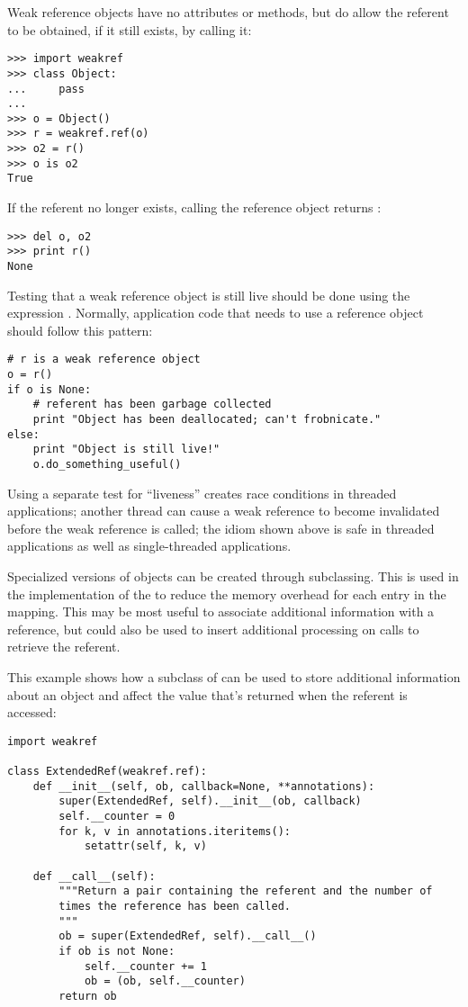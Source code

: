 Weak reference objects have no attributes or methods, but do allow the
referent to be obtained, if it still exists, by calling it:

\begin{verbatim}
>>> import weakref
>>> class Object:
...     pass
...
>>> o = Object()
>>> r = weakref.ref(o)
>>> o2 = r()
>>> o is o2
True
\end{verbatim}

If the referent no longer exists, calling the reference object returns
:

\begin{verbatim}
>>> del o, o2
>>> print r()
None
\end{verbatim}

Testing that a weak reference object is still live should be done
using the expression .  Normally,
application code that needs to use a reference object should follow
this pattern:

\begin{verbatim}
# r is a weak reference object
o = r()
if o is None:
    # referent has been garbage collected
    print "Object has been deallocated; can't frobnicate."
else:
    print "Object is still live!"
    o.do_something_useful()
\end{verbatim}

Using a separate test for ``liveness'' creates race conditions in
threaded applications; another thread can cause a weak reference to
become invalidated before the weak reference is called; the
idiom shown above is safe in threaded applications as well as
single-threaded applications.

Specialized versions of  objects can be created through
subclassing.  This is used in the implementation of the
 to reduce the memory overhead for each
entry in the mapping.  This may be most useful to associate additional
information with a reference, but could also be used to insert
additional processing on calls to retrieve the referent.

This example shows how a subclass of  can be used to store
additional information about an object and affect the value that's
returned when the referent is accessed:

\begin{verbatim}
import weakref

class ExtendedRef(weakref.ref):
    def __init__(self, ob, callback=None, **annotations):
        super(ExtendedRef, self).__init__(ob, callback)
        self.__counter = 0
        for k, v in annotations.iteritems():
            setattr(self, k, v)

    def __call__(self):
        """Return a pair containing the referent and the number of
        times the reference has been called.
        """
        ob = super(ExtendedRef, self).__call__()
        if ob is not None:
            self.__counter += 1
            ob = (ob, self.__counter)
        return ob
\end{verbatim}


